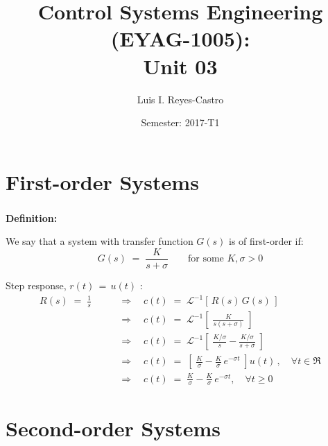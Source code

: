 \documentclass[ 10pt, xcolor = dvipsnames]{beamer}
\title[\shorttitle]{Control Systems Engineering (EYAG-1005): \\ \textbf{Unit 03} }
\author[L. I. Reyes-Castro]{Luis I. Reyes-Castro}
\institute[ESPOL]{\normalsize Escuela Superior Polit\'ecnica del Litoral (ESPOL) \\ Guayaquil - Ecuador}
\date[2017-T1]{Semester: 2017-T1}
\newcommand{\Laplace}{\mathcal{L}}
\newcommand{\LaplaceInv}{\Laplace^{-1}}
\begin{document}



\section{First-order Systems}

\begin{frame}[allowframebreaks]
\frametitle{\insertsection}

\textbf{Definition:}

We say that a system with transfer function $G(s)$ is of first-order if: 
\[
G(s) \; = \; \frac{K}{ s + \sigma }
\qquad \text{for some } K, \sigma > 0
\]
\framebreak

Step response, \ie $r(t) \, = \, u(t)$ : 
\begin{align*}
R(s) \; = \; \frac{1}{s} \qquad 
& \Longrightarrow \quad
c(t) \; = \; \LaplaceInv[ \, R(s) \, G(s) \, ] \\
& \Longrightarrow \quad
c(t) \; = \; \LaplaceInv \left[ \;
\frac{K}{ s ( s + \sigma ) } \; \right] \\[2ex]
& \Longrightarrow \quad
c(t) \; = \; \LaplaceInv \left[ \;
\frac{K / \sigma}{s} - \frac{K / \sigma}{s + \sigma} \; \right] \\[2ex]
& \Longrightarrow \quad
c(t) \; = \; \left[ \;
\frac{K}{\sigma} - \frac{K}{\sigma} \, e^{ -\sigma t }
\; \right] u(t) \, , \quad \forall t \in \Re \\[2ex]
& \Longrightarrow \quad
c(t) \; = \; 
\frac{K}{\sigma} - \frac{K}{\sigma} \, e^{ -\sigma t },
\quad \forall t \geq 0
\end{align*}

\end{frame}

\section{Second-order Systems}
\end{document}
